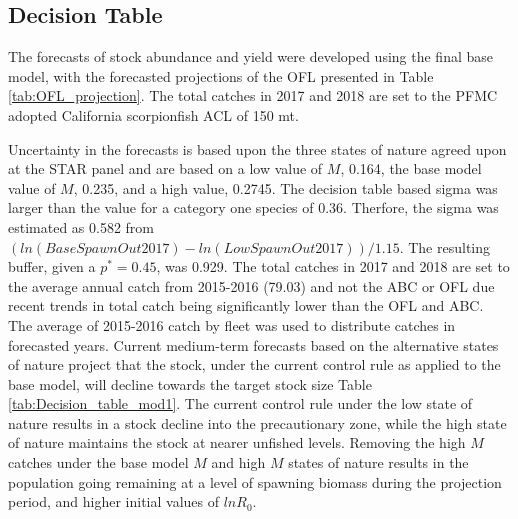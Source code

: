 \documentclass[12pt,]{article}
\begin{document}
\FloatBarrier

\subsection*{Decision Table}\label{decision-table}

The forecasts of stock abundance and yield were developed using the
final base model, with the forecasted projections of the OFL presented
in Table \ref{tab:OFL_projection}. The total catches in 2017 and 2018
are set to the PFMC adopted California scorpionfish ACL of 150 mt.

Uncertainty in the forecasts is based upon the three states of nature
agreed upon at the STAR panel and are based on a low value of \(M\),
0.164, the base model value of \(M\), 0.235, and a high value, 0.2745.
The decision table based sigma was larger than the value for a category
one species of 0.36. Therfore, the sigma was estimated as 0.582 from
\((ln(BaseSpawnOut2017) - ln(LowSpawnOut2017))/1.15\). The resulting
buffer, given a \(p^* = 0.45\), was 0.929. The total catches in 2017 and
2018 are set to the average annual catch from 2015-2016 (79.03) and not
the ABC or OFL due recent trends in total catch being significantly
lower than the OFL and ABC. The average of 2015-2016 catch by fleet was
used to distribute catches in forecasted years. Current medium-term
forecasts based on the alternative states of nature project that the
stock, under the current control rule as applied to the base model, will
decline towards the target stock size Table
\ref{tab:Decision_table_mod1}. The current control rule under the low
state of nature results in a stock decline into the precautionary zone,
while the high state of nature maintains the stock at nearer unfished
levels. Removing the high \(M\) catches under the base model \(M\) and
high \(M\) states of nature results in the population going remaining at
a level of spawning biomass during the projection period, and higher
initial values of \(lnR_0\).
\end{document}
